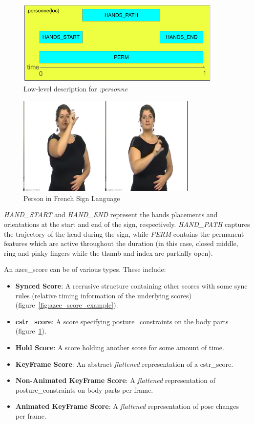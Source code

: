 \documentclass[../../main.tex]{subfiles}
\begin{document}
\begin{figure}
  \centering \includegraphics[width = 4in]{chapters/background_work/images/azee_score_person.png}
  \caption{Low-level description for \emph{:personne}}
  \label{fig:azee_score_person}
\end{figure}

\begin{figure}
  \centering \includegraphics[width = 3.5in]{chapters/background_work/images/person_lsf.png}
  \caption{Person in French Sign Language}
  \label{fig:person_lsf}
\end{figure}

\emph{HAND\_START} and \emph{HAND\_END} represent the hands placements and orientations at the start and end of the sign, respectively. \emph{HAND\_PATH} captures the trajectory of the head during the sign, while \emph{PERM} contains the permanent features which are active throughout the duration (in this case, closed middle, ring and pinky fingers while the thumb and index are partially open).

An \gls{azee_score} can be of various types. These include:

\begin{itemize}
  \item \textbf{Synced Score}: A recrusive structure containing other scores with some sync rules (relative timing information of the underlying scores) (figure~\ref{fig:azee_score_example}).
  \item \textbf{\gls{cstr_score}}: A score specifying \gls{posture_constraint}s on the body parts (figure~\ref{fig:azee_score_person}).
  \item \textbf{Hold Score}: A score holding another score for some amount of time.
  \item \textbf{KeyFrame Score}: An abstract \emph{flattened} representation of a \gls{cstr_score}.
  \item \textbf{Non-Animated KeyFrame Score}: A \emph{flattened} representation of \gls{posture_constraint}s on body parts per frame.
  \item \textbf{Animated KeyFrame Score}: A \emph{flattened} representation of pose changes per frame.
\end{itemize}
\end{document}
